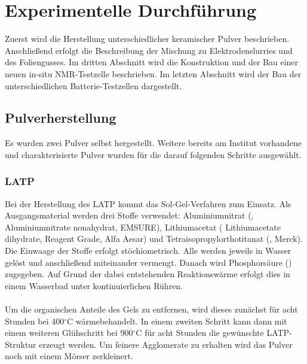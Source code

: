 \documentclass[a4paper, 11pt, headsepline,footsepline,twoside,abstract]{scrbook}
\begin{document}
\chapter{Experimentelle Durchführung}
Zuerst wird die Herstellung unterschiedlicher keramischer Pulver beschrieben. Anschließend erfolgt die Beschreibung der Mischung zu Elektrodenslurries und des Foliengusses. Im dritten Abschnitt wird die Konstruktion und der Bau einer neuen in-situ NMR-Testzelle beschrieben. Im letzten Abschnitt wird der Bau der unterschiedlichen Batterie-Testzellen dargestellt. 
\section{Pulverherstellung}
Es wurden zwei Pulver selbst hergestellt. Weitere bereits am Institut vorhandene und charakterisierte Pulver wurden für die darauf folgenden Schritte ausgewählt.
\subsection{LATP}
Bei der Herstellung des LATP kommt das Sol-Gel-Verfahren zum Einsatz. Als Ausgangsmaterial werden drei Stoffe verwendet: Aluminiumnitrat (, Aluminiumnitrate nonahydrat, EMSURE), Lithiumacetat ( Lithiumacetate dihydrate, Reagent Grade, Alfa Aesar) und Tetra\-iso\-propyl\-ortho\-titanat (, Merck). Die Einwaage der Stoffe erfolgt stöchiometrisch. Alle werden jeweils in Wasser gelöst und anschließend miteinander vermengt. Danach wird Phosphorsäure () zugegeben. Auf Grund der dabei entstehenden Reaktionswärme erfolgt dies in einem Wasserbad unter kontinuierlichen Rühren.
\\\\
Um die organischen Anteile des Gels zu entfernen, wird dieses zunächst für acht Stunden bei 400$^\circ$C wärmebehandelt. In einem zweiten Schritt kann dann mit einem weiteren Glühschritt bei 900$^\circ$C für acht Stunden die gewünschte LATP-Struktur erzeugt werden. Um feinere Agglomerate zu erhalten wird das Pulver noch mit einem Mörser zerkleinert.
\end{document}
